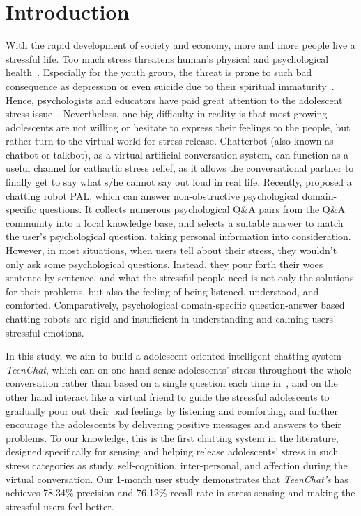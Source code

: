 
\section{Introduction}

With the rapid development of society and economy, more and more people live a stressful life. Too much stress threatens
human's physical and psychological health~\cite{60kasl1984,61hammen2005}.
Especially for the youth group, the threat is prone to such bad consequence as
depression or even suicide due to their spiritual immaturity~\cite{59Statistic}.
Hence, psychologists and educators have paid great attention to the adolescent stress issue~\cite{56colten1991,57wills1995}.
Nevertheless, one big difficulty in reality is that most growing adolescents are not willing or hesitate to
express their feelings to the people, but rather turn to the virtual world for stress release.
Chatterbot (also known as chatbot or talkbot), as a virtual artificial conversation system, can function as a
useful channel for cathartic stress relief, as it allows the
conversational partner to finally get to say what s/he cannot say out loud in real life.
Recently, \cite{25liu2013} proposed a chatting robot PAL, which
can answer non-obstructive psychological domain-specific questions. It
collects numerous psychological Q\&A pairs from the Q\&A community into a local knowledge base,
and selects a suitable answer to match the user's psychological question, taking
personal information into consideration.
However, in most situations, when users tell about their stress,
they wouldn't only ask some psychological questions. Instead, they pour forth their woes sentence by sentence.
and what the stressful people need is not only the solutions for their problems,
but also the feeling of being listened, understood, and comforted.
Comparatively, psychological domain-specific question-answer based chatting robots are rigid and insufficient in understanding and calming
users' stressful emotions.

In this study, we aim to build a adolescent-oriented
intelligent chatting system \emph{TeenChat}, which can on one hand sense adolescents' stress throughout the whole conversation rather than based on a single question each time in~\cite{25liu2013}, and on the other hand interact like a virtual friend to guide the stressful adolescents to gradually pour out their bad feelings by listening and comforting, and further encourage the adolescents by delivering positive messages and answers to their problems. To our knowledge, this is the first chatting system in the literature, designed specifically for sensing and helping release adolescents' stress in such stress categories as study, self-cognition, inter-personal, and affection during the virtual conversation. Our 1-month user study demonstrates that \emph{TeenChat's} has achieves 78.34\% precision and 76.12\% recall rate in stress sensing and making the stressful users feel better.


